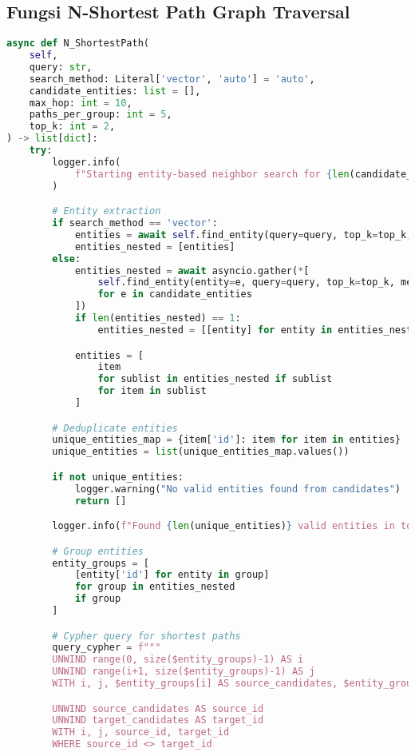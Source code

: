 \subsection{Fungsi N-Shortest Path Graph Traversal}
\begin{lstlisting}[numbers=none, language=python]
async def N_ShortestPath(
    self,
    query: str,
    search_method: Literal['vector', 'auto'] = 'auto',
    candidate_entities: list = [],
    max_hop: int = 10,
    paths_per_group: int = 5,
    top_k: int = 2,
) -> list[dict]:
    try:
        logger.info(
            f"Starting entity-based neighbor search for {len(candidate_entities)} candidates"
        )

        # Entity extraction
        if search_method == 'vector':
            entities = await self.find_entity(query=query, top_k=top_k, method='vector')
            entities_nested = [entities]
        else:
            entities_nested = await asyncio.gather(*[
                self.find_entity(entity=e, query=query, top_k=top_k, method='auto')
                for e in candidate_entities
            ])
            if len(entities_nested) == 1:
                entities_nested = [[entity] for entity in entities_nested[0]]

            entities = [
                item
                for sublist in entities_nested if sublist
                for item in sublist
            ]

        # Deduplicate entities
        unique_entities_map = {item['id']: item for item in entities}
        unique_entities = list(unique_entities_map.values())

        if not unique_entities:
            logger.warning("No valid entities found from candidates")
            return []

        logger.info(f"Found {len(unique_entities)} valid entities in total from candidates")

        # Group entities
        entity_groups = [
            [entity['id'] for entity in group]
            for group in entities_nested
            if group
        ]

        # Cypher query for shortest paths
        query_cypher = f"""
        UNWIND range(0, size($entity_groups)-1) AS i
        UNWIND range(i+1, size($entity_groups)-1) AS j
        WITH i, j, $entity_groups[i] AS source_candidates, $entity_groups[j] AS target_candidates

        UNWIND source_candidates AS source_id
        UNWIND target_candidates AS target_id
        WITH i, j, source_id, target_id
        WHERE source_id <> target_id


\end{lstlisting}
